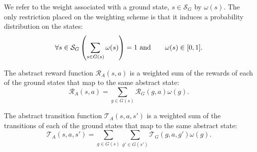 We refer to the weight associated with a ground state, $s \in \mathcal{S}_G$ by $\omega(s)$. The only restriction placed on the weighting scheme is that it induces a probability distribution on the states:
\begin{equation}
\forall s \in \mathcal{S}_G \left(\sum_{s \in G(s)} \omega(s)\right) = 1 \textrm{ and }\hspace{6mm}  \omega(s) \in [0,1].
\end{equation}
\edefn

The abstract reward function $\mathcal{R}_A(s,a)$ is a weighted sum of the rewards of each of the ground states that map to the same abstract state:
\begin{equation}
\mathcal{R}_A(s,a) = \sum_{g \in G(s)} \mathcal{R}_G(g,a) \omega(g) .
\end{equation}
\edefn

The abstract transition function $\mathcal{T}_A(s,a,s')$ is a weighted sum of the transitions of each of the ground states that map to the same abstract state:
\begin{equation}
\mathcal{T}_A(s,a,s') = \sum_{g \in G(s)} \sum_{g' \in G(s')} \mathcal{T}_G(g,a,g') \omega(g).
\end{equation}
\edefn












